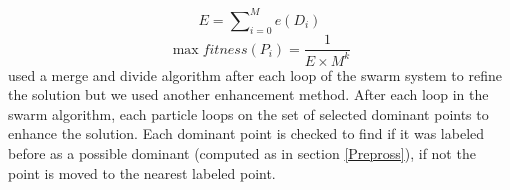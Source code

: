 \documentclass[a4paper,10pt]{IEEEconf}
\begin{document}
\begin{equation}
E=\sum\nolimits_{i = 0}^M e(D_i) 
\label{eq:errorSwarm2}
\end{equation}
\begin{equation}
\max fitness(P_i ) = \frac{1}{{E \times M^k }}
\label{eq:fitnessSwarm2}
\end{equation}
\cite{PolygonApproximationPSO} used a merge and divide algorithm after each loop of the swarm system to refine the solution but we used another enhancement method. After each loop in the swarm algorithm, each particle loops on the set of selected dominant points to enhance the solution. Each dominant point is checked to find if it was labeled before as a possible dominant (computed as in section \ref{Prepross}), if not the point is moved to the nearest labeled point.    
\end{document}
